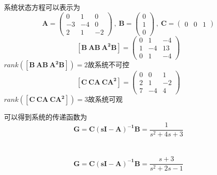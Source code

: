\documentclass[UTF8,a4paper]{ctexart}
\begin{document}
\section{}
系统状态方程可以表示为$$\mathbf{A}=\begin{pmatrix}
0&1&0\\
-3&-4&0\\
2&1&-2\end{pmatrix}\ , \ 
\mathbf{B}=\begin{pmatrix}0\\1\\0\end{pmatrix} \ , \ 
\mathbf{C}=\begin{pmatrix}0&0&1\end{pmatrix}$$ 
$$\mathbf{[B \ AB \ A^2B]}=\begin{pmatrix}
0&1&-4\\
1&-4&13\\
0&1&-4
\end{pmatrix}$$ $rank(\mathbf{[B \ AB \ A^2B]})=2$故系统不可控
$$\mathbf{[C \ CA \ CA^2]}=\begin{pmatrix}
0&0&1\\
2&1&-2\\
7&-4&4
\end{pmatrix}$$ $rank(\mathbf{[C \ CA \ CA^2]})=3$故系统可观

可以得到系统的传递函数为$$\mathbf{G=C(sI-A)^{-1}B}=\frac{1}{s^2+4s+3}$$
\section{}
\subsection{}
$$\mathbf{G=C(sI-A)^{-1}B}=\frac{s+3}{s^2+2s-1}$$
\end{document}
